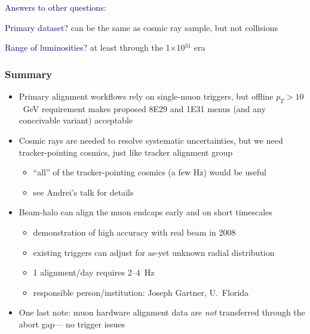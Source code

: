 \documentclass[compress]{beamer}
\begin{document}
\begin{frame}
\begin{columns}
\begin{itemize}
\end{itemize}
\end{columns}

\vspace{0.5 cm}
\hspace{-0.83 cm} \textcolor{darkblue}{\Large Answers to other questions:}

\vspace{0.2 cm}
\textcolor{darkblue}{Primary dataset?} can be the same as cosmic ray sample, but not \mbox{collisions\hspace{-1 cm}}

\vspace{0.2 cm}
\textcolor{darkblue}{Range of luminosities?} at least through the 1$\times$10$^{31}$ era
\end{frame}

\begin{frame}
\frametitle{Summary}
\begin{itemize}\setlength{\itemsep}{0.25 cm}
\item Primary alignment workflows rely on single-muon triggers, but
  offline $p_T > 10$~GeV requirement makes proposed 8E29 and 1E31
  menus (and any conceivable variant) acceptable

\item Cosmic rays are needed to resolve systematic uncertainties, but
  we need tracker-pointing cosmics, just like tracker alignment group
\begin{itemize}\setlength{\itemsep}{0.1 cm}
\item ``all'' of the tracker-pointing cosmics (a few Hz) would be \mbox{useful\hspace{-1 cm}}
\item see Andrei's talk for details
\end{itemize}

\item Beam-halo can align the muon endcaps early and on short \mbox{timescales\hspace{-1 cm}}
\begin{itemize}\setlength{\itemsep}{0.1 cm}
\item demonstration of high accuracy with real beam in 2008
\item existing triggers can adjust for as-yet unknown radial \mbox{distribution\hspace{-1 cm}}
\item 1 alignment/day requires 2--4~Hz
\item responsible person/institution: Joseph Gartner, U.\ Florida
\end{itemize}

\item One last note: muon hardware alignment data are {\it not}
  transferred through the abort gap--- no trigger issues

\end{itemize}
\label{numpages}
\end{frame}
\end{document}
